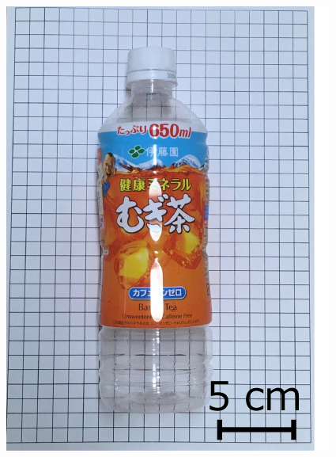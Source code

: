 \begin{figure}[H]
\begin{minipage}{0.19\columnwidth}
    \end{minipage}
    \begin{minipage}{0.19\columnwidth}
        \centering
        \includegraphics[clip, width=\linewidth]{figure/chapter4/bottle_650ml}
    \end{minipage}
    \begin{minipage}{0.19\columnwidth}
        \centering

\end{minipage}
\end{figure}

